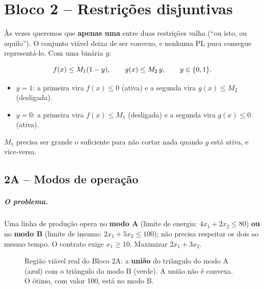 \chapter{Bloco 2 -- Restrições disjuntivas}
\label{cap:bloco2}

Às vezes queremos que \textbf{apenas uma} entre duas restrições valha (``ou isto, ou aquilo''). O conjunto viável
deixa de ser convexo, e nenhuma PL pura consegue representá-lo. Com uma binária $y$:

\begin{receita}[disjunção ``$f(x)\le0$ OU $g(x)\le0$'']
\[
f(x)\le M_1(1-y),\qquad g(x)\le M_2\,y,\qquad y\in\{0,1\}.
\]
\begin{itemize}
  \item $y=1$: a primeira vira $f(x)\le0$ (ativa) e a segunda vira $g(x)\le M_2$ (desligada).
  \item $y=0$: a primeira vira $f(x)\le M_1$ (desligada) e a segunda vira $g(x)\le0$ (ativa).
\end{itemize}
$M_1$ precisa ser grande o suficiente para não cortar nada quando $g$ está ativa, e vice-versa.
\end{receita}

\section{2A -- Modos de operação}

\paragraph{O problema.} Uma linha de produção opera no \textbf{modo A} (limite de energia: $4x_1+2x_2\le80$)
\textbf{ou} no \textbf{modo B} (limite de insumo: $2x_1+5x_2\le100$); não precisa respeitar os dois ao mesmo tempo.
O contrato exige $x_1\ge10$. Maximizar $2x_1+3x_2$.

\begin{figure}[H]
\centering
{}
\caption{Região viável real do Bloco 2A: a \textbf{união} do triângulo do modo A (azul) com o triângulo do modo B
(verde). A união não é convexa. O ótimo, com valor 100, está no modo B.}
\end{figure}

